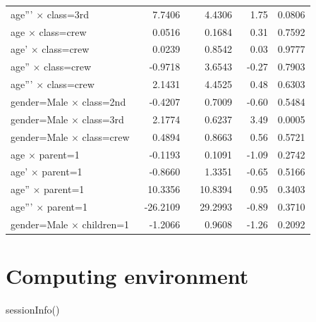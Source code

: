\documentclass[]{interact}
\theoremstyle{plain}%
\theoremstyle{definition}
\theoremstyle{remark}
\newenvironment{Shaded}{\begin{snugshade}}{\end{snugshade}}
\newcommand{\FunctionTok}[1]{\textcolor[rgb]{0.00,0.00,0.00}{#1}}
\newcommand{\NormalTok}[1]{#1}
\begin{document}
\begin{longtable}{lrrrr}
 age''' $\times$ class=3rd&~  7.7406~&~ 4.4306~& 1.75&0.0806\tabularnewline
 age $\times$ class=crew&~  0.0516~&~ 0.1684~& 0.31&0.7592\tabularnewline
 age' $\times$ class=crew&~  0.0239~&~ 0.8542~& 0.03&0.9777\tabularnewline
 age'' $\times$ class=crew&~ -0.9718~&~ 3.6543~&-0.27&0.7903\tabularnewline
 age''' $\times$ class=crew&~  2.1431~&~ 4.4525~& 0.48&0.6303\tabularnewline
 gender=Male $\times$ class=2nd&~ -0.4207~&~ 0.7009~&-0.60&0.5484\tabularnewline
 gender=Male $\times$ class=3rd&~  2.1774~&~ 0.6237~& 3.49&0.0005\tabularnewline
 gender=Male $\times$ class=crew&~  0.4894~&~ 0.8663~& 0.56&0.5721\tabularnewline
 age $\times$ parent=1&~ -0.1193~&~ 0.1091~&-1.09&0.2742\tabularnewline
 age' $\times$ parent=1&~ -0.8660~&~ 1.3351~&-0.65&0.5166\tabularnewline
 age'' $\times$ parent=1&~ 10.3356~&~10.8394~& 0.95&0.3403\tabularnewline
 age''' $\times$ parent=1&~-26.2109~&~29.2993~&-0.89&0.3710\tabularnewline
 gender=Male $\times$ children=1&~ -1.2066~&~ 0.9608~&-1.26&0.2092\tabularnewline
 \hline
 \end{longtable}
 \addtocounter{table}{-1}

\normalsize

\hypertarget{computing-environment}{%
\section{Computing environment}\label{computing-environment}}

\begin{Shaded}
\begin{Highlighting}[]
\FunctionTok{sessionInfo}\NormalTok{()}
\end{Highlighting}
\end{Shaded}
\end{document}
